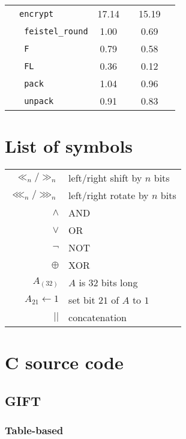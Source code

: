 \begin{table}[!htpb]
\begin{tabular}{llcccc}
                                                & \texttt{encrypt} & 17.14 & & 15.19 & \\
        \cmidrule(lr){2-2}
                                                & \texttt{ feistel\_round} & 1.00 & & 0.69 & \\
                                                & \texttt{ F} & 0.79 & & 0.58 & \\
                                                & \texttt{ FL} & 0.36 & & 0.12 & \\
                                                & \texttt{ pack} & 1.04 & & 0.96 & \\
                                                & \texttt{ unpack} & 0.91 & & 0.83 & \\
        \bottomrule
    \end{tabular}
\end{table}

\chapter{List of symbols}

\begin{center}
    \begin{tabular}{rl}
        $\ll_n/\gg_n$ & left/right shift by $n$ bits \\
        $\lll_n/\ggg_n$ & left/right rotate by $n$ bits \\
        $\land$ & AND \\
        $\lor$ & OR \\
        $\lnot$ & NOT \\
        $\oplus$ & XOR \\
        $A_{(32)}$ & $A$ is 32 bits long \\
        $A_{21}\leftarrow 1$ & set bit $21$ of $A$ to $1$ \\
        $||$ & concatenation
    \end{tabular}
\end{center}

\chapter{C source code}
\label{app:cimpl}

\section{GIFT}
\subsection{Table-based}

